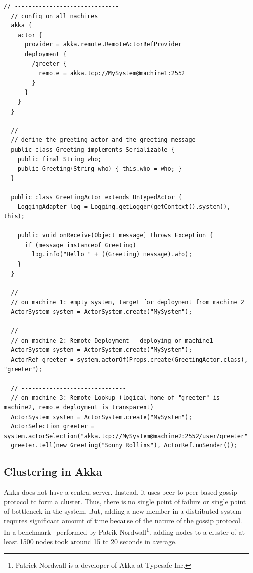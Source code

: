 \begin{lstlisting}[caption=A sample Akka Configuration and Code for Remote Actors~\cite{akkaHome}, label=lst:akkaRemoting]
  // ------------------------------
  // config on all machines
  akka {
    actor {
      provider = akka.remote.RemoteActorRefProvider
      deployment {
        /greeter {
          remote = akka.tcp://MySystem@machine1:2552
        }
      }
    }
  }

  // ------------------------------
  // define the greeting actor and the greeting message
  public class Greeting implements Serializable {
    public final String who;
    public Greeting(String who) { this.who = who; }
  }

  public class GreetingActor extends UntypedActor {
    LoggingAdapter log = Logging.getLogger(getContext().system(), this);

    public void onReceive(Object message) throws Exception {
      if (message instanceof Greeting)
        log.info("Hello " + ((Greeting) message).who);
    }
  }

  // ------------------------------
  // on machine 1: empty system, target for deployment from machine 2
  ActorSystem system = ActorSystem.create("MySystem");

  // ------------------------------
  // on machine 2: Remote Deployment - deploying on machine1
  ActorSystem system = ActorSystem.create("MySystem");
  ActorRef greeter = system.actorOf(Props.create(GreetingActor.class), "greeter");

  // ------------------------------
  // on machine 3: Remote Lookup (logical home of "greeter" is machine2, remote deployment is transparent)
  ActorSystem system = ActorSystem.create("MySystem");
  ActorSelection greeter = system.actorSelection("akka.tcp://MySystem@machine2:2552/user/greeter");
  greeter.tell(new Greeting("Sonny Rollins"), ActorRef.noSender());
\end{lstlisting}

  \subsection{Clustering in Akka}
  Akka does not have a central server. Instead, it uses peer-to-peer based gossip protocol to form a cluster. Thus, there is no single point of failure or single point of bottleneck in the system. But, adding a new member in a distributed system requires significant amount of time because of the nature of the gossip protocol. In a benchmark~\cite{akkaBenchmark} performed by Patrik Nordwall\footnote{Patrick Nordwall is a developer of Akka at Typesafe Inc.}, adding nodes to a cluster of at least 1500 nodes took around 15 to 20 seconds in average.


